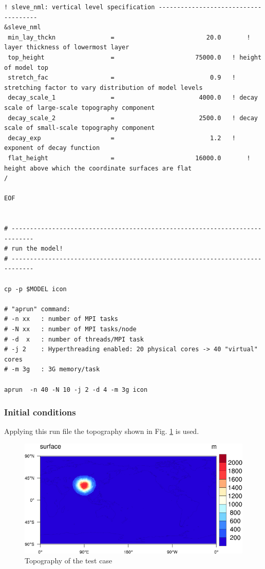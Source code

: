 \begin{landscape}
\begin{Verbatim}[frame=single]
! sleve_nml: vertical level specification -------------------------------------
&sleve_nml
 min_lay_thckn               =                         20.0       ! layer thickness of lowermost layer
 top_height                  =                      75000.0	  ! height of model top
 stretch_fac                 =                          0.9	  ! stretching factor to vary distribution of model levels
 decay_scale_1               =                       4000.0	  ! decay scale of large-scale topography component
 decay_scale_2               =                       2500.0	  ! decay scale of small-scale topography component
 decay_exp                   =                          1.2	  ! exponent of decay function
 flat_height                 =                      16000.0       ! height above which the coordinate surfaces are flat
/

EOF


# ----------------------------------------------------------------------------
# run the model!
# ----------------------------------------------------------------------------

cp -p $MODEL icon

# "aprun" command:
# -n xx   : number of MPI tasks
# -N xx   : number of MPI tasks/node
# -d  x   : number of threads/MPI task
# -j 2    : Hyperthreading enabled: 20 physical cores -> 40 "virtual" cores
# -m 3g   : 3G memory/task

aprun  -n 40 -N 10 -j 2 -d 4 -m 3g icon

\end{Verbatim}

\end{landscape}

\subsubsection{Initial conditions}

Applying this run file the topography shown in Fig. \ref{fig:mountain} is used.

\begin{figure}[h!]%
\centering
\includegraphics[width=0.95\linewidth]{pictures/surface-small.png}
\caption{Topography of the test case}\label{fig:mountain}
\end{figure}

